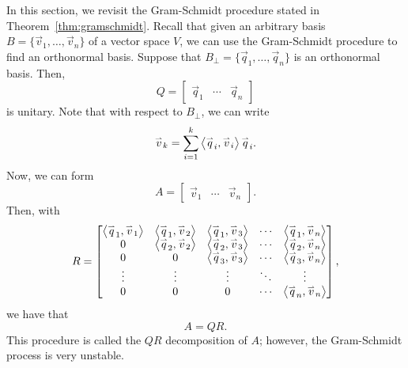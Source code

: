         In this section, we revisit the Gram-Schmidt procedure stated in Theorem~\ref{thm:gramschmidt}. Recall that given an arbitrary basis \(B=\{\vec{v}_1,\ldots,\vec{v}_n\}\) of a vector space \(V\), we can use the Gram-Schmidt procedure to find an orthonormal basis. Suppose that \(B_\perp=\{\vec{q}_1,\ldots,\vec{q}_n\}\) is an orthonormal basis. Then, 
        \begin{equation*}
            Q=\begin{bmatrix}
                \vec{q}_1 & \cdots & \vec{q}_n
            \end{bmatrix}
        \end{equation*}
        is unitary. Note that with respect to \(B_\perp\), we can write
        \begin{equation*}
            \overset{_{\rightharpoonup}}{v}_k=\sum_{i=1}^k\left\langle \overset{_{\rightharpoonup}}{q}_i,\overset{_{\rightharpoonup}}{v}_i\right\rangle\overset{_{\rightharpoonup}}{q}_i.
        \end{equation*}
        Now, we can form
        \begin{equation*}
            A=\begin{bmatrix}
                \vec{v}_1 & \cdots & \vec{v}_n
            \end{bmatrix}.
        \end{equation*}
        Then, with 
        \begin{equation*}
            R=\begin{bmatrix}
                \left\langle \overset{_{\rightharpoonup}}{q}_1,\overset{_{\rightharpoonup}}{v}_1\right\rangle & \left\langle \overset{_{\rightharpoonup}}{q}_1,\overset{_{\rightharpoonup}}{v}_2\right\rangle & \left\langle \overset{_{\rightharpoonup}}{q}_1,\overset{_{\rightharpoonup}}{v}_3\right\rangle  & \cdots & \left\langle \overset{_{\rightharpoonup}}{q}_1,\overset{_{\rightharpoonup}}{v}_n\right\rangle \\
                0 &  \left\langle \overset{_{\rightharpoonup}}{q}_2,\overset{_{\rightharpoonup}}{v}_2\right\rangle & \left\langle \overset{_{\rightharpoonup}}{q}_2,\overset{_{\rightharpoonup}}{v}_3\right\rangle & \cdots & \left\langle \overset{_{\rightharpoonup}}{q}_2,\overset{_{\rightharpoonup}}{v}_n\right\rangle \\
                0 & 0 & \left\langle \overset{_{\rightharpoonup}}{q}_3,\overset{_{\rightharpoonup}}{v}_3\right\rangle & \cdots & \left\langle \overset{_{\rightharpoonup}}{q}_3,\overset{_{\rightharpoonup}}{v}_n\right\rangle \\
                \vdots & \vdots & \vdots & \ddots & \vdots \\
                0 & 0 & 0 & \cdots & \left\langle \overset{_{\rightharpoonup}}{q}_n,\overset{_{\rightharpoonup}}{v}_n\right\rangle
            \end{bmatrix},
        \end{equation*}
        we have that
        \begin{equation*}
            A=QR.
        \end{equation*}
        This procedure is called the \(QR\) decomposition of \(A\); however, the Gram-Schmidt process is very unstable.
        \\
        \\
